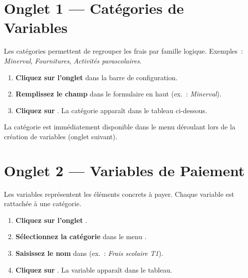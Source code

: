 
\section{Onglet 1 --- Cat\'egories de Variables}

Les cat\'egories permettent de regrouper les frais par famille logique. Exemples~: \textit{Minerval}, \textit{Fournitures}, \textit{Activit\'es parascolaires}.

\begin{etape}[title=Proc\'edure : Cr\'eer une cat\'egorie]
\begin{enumerate}[leftmargin=1.5cm,label=\textbf{\arabic*.},itemsep=10pt]
  \item \textbf{Cliquez sur l'onglet}  dans la barre de configuration.
  \item \textbf{Remplissez le champ}  dans le formulaire en haut (ex.\ : \textit{Minerval}).
  \item \textbf{Cliquez sur} . La cat\'egorie appara\^it dans le tableau ci-dessous.
\end{enumerate}
\end{etape}

\begin{resultat}
La cat\'egorie est imm\'ediatement disponible dans le menu d\'eroulant  lors de la cr\'eation de variables (onglet suivant).
\end{resultat}

\section{Onglet 2 --- Variables de Paiement}

Les variables repr\'esentent les \'el\'ements concrets \`a payer. Chaque variable est rattach\'ee \`a une cat\'egorie.

\begin{etape}[title=Proc\'edure : Cr\'eer une variable]
\begin{enumerate}[leftmargin=1.5cm,label=\textbf{\arabic*.},itemsep=10pt]
  \item \textbf{Cliquez sur l'onglet} .
  \item \textbf{S\'electionnez la cat\'egorie} dans le menu .
  \item \textbf{Saisissez le nom} dans  (ex.\ : \textit{Frais scolaire T1}).
  \item \textbf{Cliquez sur} . La variable appara\^it dans le tableau.
\end{enumerate}
\end{etape}

